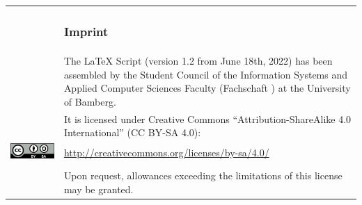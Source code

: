\newpage
\thispagestyle{empty}

\mbox{}
\vfill

\begin{tabular}{@{}lp{9cm}}
	& \subsubsection*{Imprint} \\
	& The \LaTeX{} Script (version 1.2 from June 18th, 2022) has been assembled by the Student Council of the Information Systems and Applied Computer Sciences Faculty (Fachschaft \acro{WIAI}) at the University of Bamberg. \\
	& It is licensed under Creative Commons \enquote{Attribution-ShareAlike 4.0 International} (CC BY-SA 4.0): \\
	\href{http://creativecommons.org/licenses/by-sa/4.0/}{\includegraphics[height=.5cm]{graphics/cc-by-sa}} & \url{http://creativecommons.org/licenses/by-sa/4.0/} \\ \\
	& Upon request, allowances exceeding the limitations of this license may be granted.
\end{tabular}